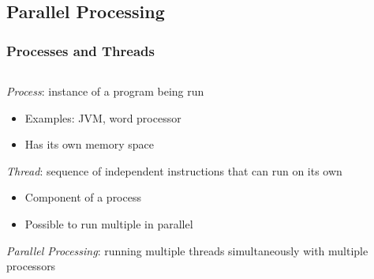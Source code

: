 \documentclass{beamer}
\newcommand{\linespace}{\vskip 0.25cm}
\begin{document}
\subsection[PP Basics]{Parallel Processing}

\begin{frame}

\frametitle{Processes and Threads}

\begin{columns}
\begin{column}{0.7\textwidth}

\emph{Process}: instance of a program being run
\begin{itemize}
\item Examples: JVM, word processor
\item Has its own memory space
\end{itemize}

\linespace
\linespace

\emph{Thread}: sequence of independent instructions that can run on its own
\begin{itemize}
\item Component of a process %
\item Possible to run multiple in parallel
\end{itemize}

\linespace
\linespace

\emph{Parallel Processing}: running multiple threads simultaneously with multiple processors

\end{column}

\begin{column}{0.30\textwidth}


\end{column}
\end{columns}
\end{frame}
\end{document}

